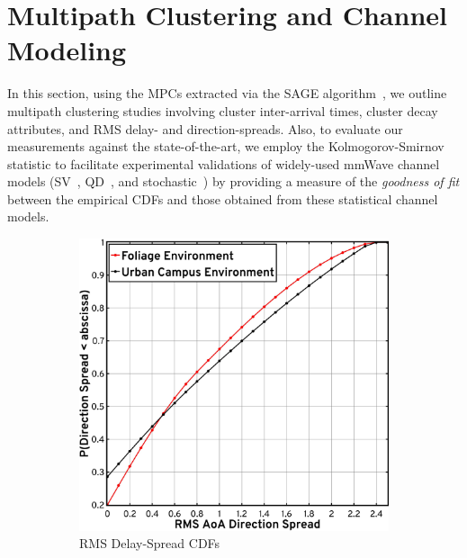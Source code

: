 \documentclass[12pt, draftcls, onecolumn]{IEEEtran}
\begin{document}
{%
\section{Multipath Clustering and Channel Modeling}\label{S5}
In this section, using the MPCs extracted via the SAGE algorithm~\cite{SAGE}, we outline multipath clustering studies involving cluster inter-arrival times, cluster decay attributes, and RMS delay- and direction-spreads. Also, to evaluate our measurements against the state-of-the-art, we employ the Kolmogorov-Smirnov statistic to facilitate experimental validations of widely-used mmWave channel models (SV~\cite{Indoor60G}, QD~\cite{QDC_NIST}, and stochastic~\cite{Indoor60G}) by providing a measure of the \emph{goodness of fit} between the empirical CDFs and those obtained from these statistical channel models.
\begin{figure} [t]
    \centering
    \begin{subfigure}{0.495\linewidth}
        \centering
        \includegraphics[width=1.0\linewidth]{figs/rms_direction_spread.pdf}
        \caption{RMS Delay-Spread CDFs}
        \label{F11a}
    \end{subfigure}
    \begin{subfigure}{0.495\linewidth}
        \centering

\end{subfigure}
\end{figure}}
\end{document}
